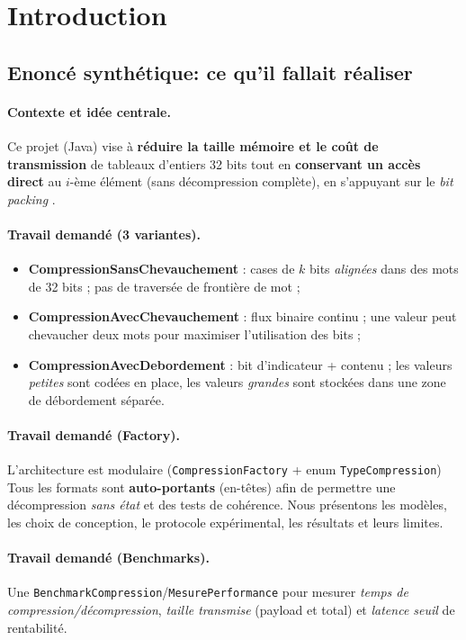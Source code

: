 \section{Introduction}
\label{sec:intro}

\subsection*{Enoncé synthétique: ce qu'il fallait réaliser}



\paragraph{Contexte et idée centrale.}
Ce projet (Java) vise à \textbf{réduire la taille mémoire et le coût de transmission} de tableaux d'entiers 32 bits tout en \textbf{conservant un accès direct} au $i$-ème élément (sans décompression complète), en s'appuyant sur le \textit{bit packing} \cite{bitpacking}. 

\paragraph{Travail demandé (3 variantes).}
\begin{itemize}
  \item \textbf{CompressionSansChevauchement} : cases de $k$ bits \emph{alignées} dans des mots de 32 bits ; pas de traversée de frontière de mot ;
  \item \textbf{CompressionAvecChevauchement} : flux binaire continu ; une valeur peut chevaucher deux mots pour maximiser l'utilisation des bits ;
  \item \textbf{CompressionAvecDebordement} : bit d'indicateur + contenu ; les valeurs \emph{petites} sont codées en place, les valeurs \emph{grandes} sont stockées dans une zone de débordement séparée.
\end{itemize}

\paragraph{Travail demandé (Factory).}
L'architecture est modulaire (\texttt{CompressionFactory} + enum \texttt{TypeCompression})  Tous les formats sont \textbf{auto-portants} (en-têtes) afin de permettre une décompression \emph{sans état} et des tests de cohérence. Nous présentons les modèles, les choix de conception, le protocole expérimental, les résultats et leurs limites.
\paragraph{Travail demandé (Benchmarks).}
Une \texttt{BenchmarkCompression}/\texttt{MesurePerformance} pour mesurer \emph{temps de compression/décompression}, \emph{taille transmise} (payload et total) et \emph{latence seuil} de rentabilité.

